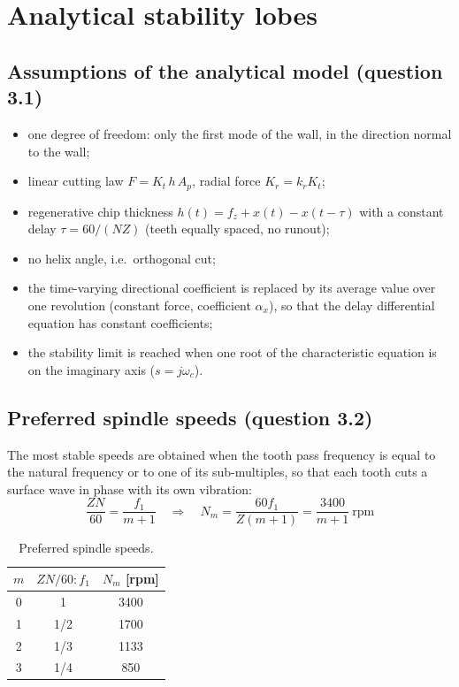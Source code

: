 \documentclass[11pt,a4paper]{article}
\begin{document}
\section{Analytical stability lobes}

\subsection{Assumptions of the analytical model (question 3.1)}
\begin{itemize}
  \item one degree of freedom: only the first mode of the wall, in the direction normal to the wall;
  \item linear cutting law $F=K_t\,h\,A_p$, radial force $K_r=k_r K_t$;
  \item regenerative chip thickness $h(t)=f_z+x(t)-x(t-\tau)$ with a constant delay
        $\tau=60/(NZ)$ (teeth equally spaced, no runout);
  \item no helix angle, i.e.\ orthogonal cut;
  \item the time-varying directional coefficient is replaced by its average value over one
        revolution (constant force, coefficient $\alpha_x$), so that the delay
        differential equation has constant coefficients;
  \item the stability limit is reached when one root of the characteristic equation is on
        the imaginary axis ($s=j\omega_c$).
\end{itemize}

\subsection{Preferred spindle speeds (question 3.2)}
The most stable speeds are obtained when the tooth pass frequency is equal to the natural
frequency or to one of its sub-multiples, so that each tooth cuts a surface wave in phase
with its own vibration:
\begin{equation}
\frac{ZN}{60}=\frac{f_1}{m+1}\quad\Rightarrow\quad N_m=\frac{60 f_1}{Z(m+1)}=\frac{3400}{m+1}\ \text{rpm}
\end{equation}

\begin{table}[H]
\centering
\caption{Preferred spindle speeds.}
\begin{tabular}{ccc}
\toprule
$m$ & $ZN/60 : f_1$ & $N_m$ [rpm] \\
\midrule
0 & 1 & 3400 \\
1 & 1/2 & 1700 \\
2 & 1/3 & 1133 \\
3 & 1/4 & 850 \\
\bottomrule
\end{tabular}
\end{table}
\end{document}

